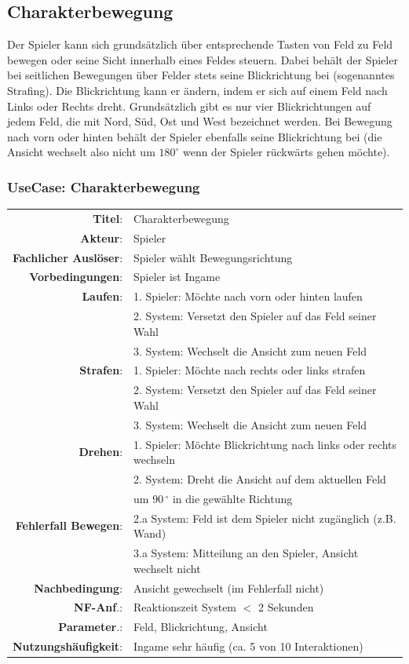 \subsection{Charakterbewegung}
Der \gls{Spieler} kann sich grundsätzlich über entsprechende Tasten von Feld
zu Feld bewegen oder seine Sicht innerhalb eines Feldes steuern. Dabei behält der
\gls {Spieler} bei seitlichen Bewegungen über Felder stets seine Blickrichtung bei (sogenanntes Strafing).
Die Blickrichtung kann er ändern, indem er sich auf einem Feld nach Links oder Rechts dreht.
Grundsätzlich gibt es nur vier Blickrichtungen auf jedem Feld, die mit Nord, Süd, Ost und
West bezeichnet werden. Bei Bewegung nach vorn oder hinten behält der Spieler ebenfalls seine Blickrichtung
bei (die Ansicht wechselt also nicht um $180 ^{\circ}$ wenn der Spieler rückwärts gehen möchte). 

\subsubsection{UseCase: Charakterbewegung}
\begin{center}
	\begin{tabular}{|r l|}
	  \hline
	  \textbf{Titel}: & Charakterbewegung\\
	  \textbf{Akteur}: & Spieler \\
	  \textbf{Fachlicher Auslöser}: & Spieler wählt Bewegungsrichtung \\
	  \textbf{Vorbedingungen}: & Spieler ist Ingame \\
	  \hline
	  \textbf{Laufen}:
		& 1. Spieler: Möchte nach vorn oder hinten laufen \\
		& 2. System: Versetzt den Spieler auf das Feld seiner Wahl \\
		& 3. System: Wechselt die Ansicht zum neuen Feld \\
	  \textbf{Strafen}:
		& 1. Spieler: Möchte nach rechts oder links strafen \\
		& 2. System: Versetzt den Spieler auf das Feld seiner Wahl \\
		& 3. System: Wechselt die Ansicht zum neuen Feld \\
	  \textbf{Drehen}:
		& 1. Spieler: Möchte Blickrichtung nach links oder rechts wechseln \\
		& 2. System: Dreht die Ansicht auf dem aktuellen Feld \\
		& um $90\,^{\circ}$ in die gewählte Richtung\\
	 \textbf{Fehlerfall Bewegen}:
		& 2.a System: Feld ist dem Spieler nicht zugänglich (z.B. Wand) \\
		& 3.a System: Mitteilung an den Spieler, Ansicht wechselt nicht \\
	  \hline
	  \textbf{Nachbedingung}: & Ansicht gewechselt (im Fehlerfall nicht) \\
	  \textbf{NF-Anf}.: & Reaktionszeit System $<$ 2 Sekunden \\
	  \textbf{Parameter}.: & Feld, Blickrichtung, Ansicht \\
	  \textbf{Nutzungshäufigkeit}: & Ingame sehr häufig (ca. 5 von 10 Interaktionen) \\
	  \hline
	\end{tabular}
\end{center}

